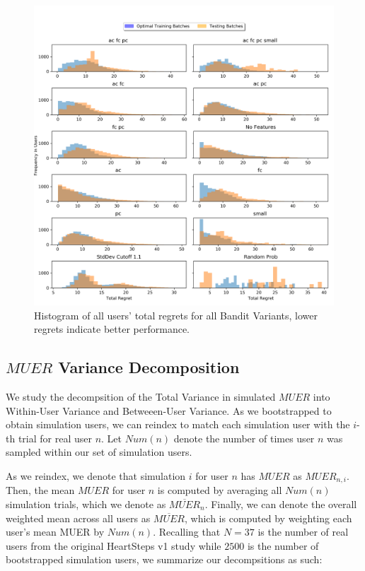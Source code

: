 \begin{figure}[H]
\includegraphics[width=1.35\textwidth,center]{figures/totalregrethists.png}%
\caption{Histogram of all users' total regrets for all Bandit Variants, lower regrets indicate better performance.}
\label{Histogram of all Users' Total Regrets for all Bandit Variants}
\end{figure}

\clearpage

\subsection{$MUER$ Variance Decomposition}
\label{Variance Decomposition}

We study the decompsition of the Total Variance in simulated $MUER$ into Within-User Variance and Betweeen-User Variance.  As we bootstrapped to obtain simulation users, we can reindex to match each simulation user with the $i$-th trial for real user $n$.  Let $Num(n)$ denote the number of times user $n$ was sampled within our set of simulation users.

As we reindex, we denote that simulation $i$ for user $n$ has $MUER$ as $MUER_{n,i}$.  Then, the mean $MUER$ for user $n$ is computed by averaging all $Num(n)$ simulation trials, which we denote as $\overline{MUER}_{n}$.  Finally, we can denote the overall weighted mean across all users as $\overline{MUER}$, which is computed by weighting each user's mean MUER by $Num(n)$.  Recalling that $N = 37$ is the number of real users from the original HeartSteps v1 study while $2500$ is the number of bootstrapped simulation users, we summarize our decompsitions as such:

